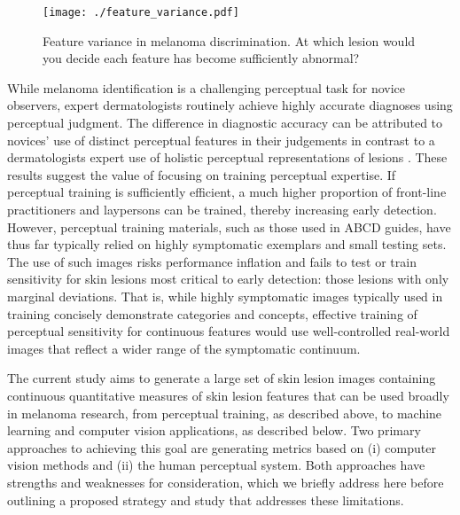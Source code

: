 \documentclass[
    man, 12pt, a4paper,
    donotrepeattitle, floatsintext, draftfirst
]{apa7}
\begin{document}
\begin{figure}[htb]
    \caption{Feature variance in melanoma discrimination. At which lesion would you decide each feature has become sufficiently abnormal?}
    \centering
    \texttt{[image: ./feature\_variance.pdf]}
    \label{fig:eg_discrimination}
\end{figure}

{\color{red}
    While melanoma identification is a challenging perceptual task for novice observers, expert dermatologists routinely achieve highly accurate diagnoses using perceptual judgment.
    The difference in diagnostic accuracy can be attributed to novices' use of distinct perceptual features in their judgements in contrast to a dermatologists expert use of holistic perceptual representations of lesions \parencite{norman1989development, gachon2005first}.
    These results suggest the value of focusing on training perceptual expertise.
    If perceptual training is sufficiently efficient, a much higher proportion of front-line practitioners and laypersons can be trained, thereby increasing early detection.
    However, perceptual training materials, such as those used in ABCD guides, have thus far typically relied on highly symptomatic exemplars and small testing sets.
    The use of such images risks performance inflation and fails to test or train sensitivity for skin lesions most critical to early detection: those lesions with only marginal deviations.
    That is, while highly symptomatic images typically used in training concisely demonstrate categories and concepts, effective training of perceptual sensitivity for continuous features would use well-controlled real-world images that reflect a wider range of the symptomatic continuum.
}

The current study aims to generate a large set of skin lesion images containing continuous quantitative measures of skin lesion features that can be used broadly in melanoma research, from perceptual training, as described above, to machine learning and computer vision applications, as described below.
Two primary approaches to achieving this goal are generating metrics based on (i) computer vision methods and (ii) the human perceptual system.
Both approaches have strengths and weaknesses for consideration, which we briefly address here before outlining a proposed strategy and study that addresses these limitations.
\end{document}
